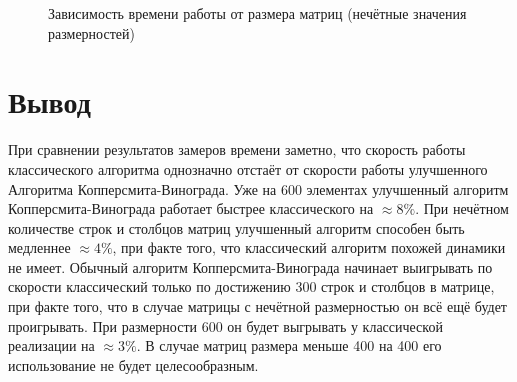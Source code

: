 \documentclass[12pt]{report}
\begin{document}
\begin{figure}[h]
	\begin{center}
	\captionsetup{justification=centering}
	\caption{Зависимость времени работы от размера матриц (нечётные значения размерностей)}
	\label{timeRes2}
	\end{center}
\end{figure}

\section*{Вывод}
При сравнении результатов замеров времени заметно, что скорость работы классического алгоритма однозначно отстаёт от скорости работы улучшенного Алгоритма Копперсмита-Винограда. Уже на 600 элементах улучшенный алгоритм Копперсмита-Винограда работает быстрее классического на $\approx8\%$. При нечётном количестве строк и столбцов матриц улучшенный алгоритм способен быть медленнее $\approx4\%$, при факте того, что классический алгоритм похожей динамики не имеет. Обычный алгоритм Копперсмита-Винограда начинает выигрывать по скорости классический только по достижению 300 строк и столбцов в матрице, при факте того, что в случае матрицы с нечётной размерностью он всё ещё будет проигрывать. При размерности 600 он будет выгрывать у классической реализации на $\approx3\%$. В случае матриц размера меньше 400 на 400 его использование не будет целесообразным.
\end{document}
